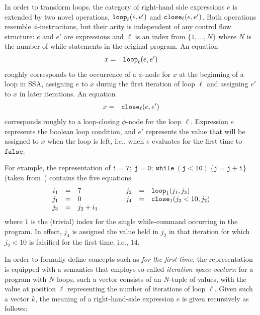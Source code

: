 In order to transform loops, the category of right-hand side
expressions $e$ is extended by two novel operations, $\mathtt{loop}_{{\ell}}({e},{e'})$ and $\mathtt{close}_{{\ell}}({e},{e'})$.
Both operations resemble $\phi$-instructions, but their arity is
independent of any control flow structure: $e$ and $e'$ are
expressions and $\ell$ is an index from $\{1,\ldots,N\}$ where $N$ is
the number of while-statements in the original program.  An equation
\begin{eqnarray*}
x & = & \mathtt{loop}_{{\ell}}({e},{e'})
\end{eqnarray*}
roughly corresponds to the occurrence of a $\phi$-node for $x$ at the
beginning of a loop in SSA, assigning $e$ to $x$ during the first
iteration of loop $\ell$ and assigning $e'$ to $x$ in later
iterations.
An equation 
\begin{eqnarray*}
x & = & \mathtt{close}_{{\ell}}({e},{e'})
\end{eqnarray*}
corresponds roughly to a loop-closing $\phi$-node for the loop
$\ell$. Expression $e$ represents the boolean loop condition, and $e'$
represents the value that will be assigned to $x$ when the loop is
left, i.e., when $e$ evaluates for the first time to $\mathtt{false}$.

For example, the representation of
$\mathtt{i=7;\ j=0;\ while\ (j<10)\ \{j=j+i\}}$
(taken from~\cite{PopJS2007}) contains the five equations
$$
\begin{array}{rclcrcl}
i_1 & = & 7 & \qquad & j_2 & = & \mathtt{loop}_{{1}}({j_1},{j_3})\\
j_1 & = & 0 & & j_4 & = & \mathtt{close}_{{1}}({j_2 < 10},{j_2})\\
j_3 & = & j_2 + i_1
\end{array} 
$$ 
where $1$ is the (trivial) index for the single while-command
occurring in the program.  In effect, $j_4$ is assigned the value held
in $j_2$ in that iteration for which $j_2 < 10$ is falsified for the
first time, i.e., $14$.

In order to formally define concepts such as \emph{for the first
time}, the representation is equipped with a semantics that employs
so-called
\emph{iteration space vectors}: for a program with $N$ loops, such
a vector consists of an $N$-tuple of values, with the value at
position $\ell$ representing the number of iterations of loop $\ell$.
Given such a vector $k$, the meaning of a right-hand-side expression
$e$ is given recursively as follows:

